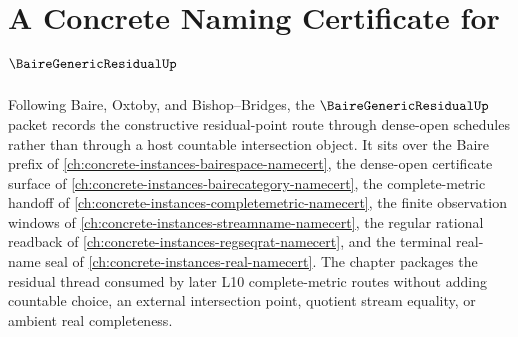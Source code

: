 \chapter{A Concrete Naming Certificate for $\BaireGenericResidualUp$}
\label{ch:concrete-instances-baire-generic-residual-namecert}

Following Baire, Oxtoby, and Bishop--Bridges, the $\BaireGenericResidualUp$ packet records the constructive residual-point route through dense-open schedules rather than through a host countable intersection object. It sits over the Baire prefix of \autoref{ch:concrete-instances-bairespace-namecert}, the dense-open certificate surface of \autoref{ch:concrete-instances-bairecategory-namecert}, the complete-metric handoff of \autoref{ch:concrete-instances-completemetric-namecert}, the finite observation windows of \autoref{ch:concrete-instances-streamname-namecert}, the regular rational readback of \autoref{ch:concrete-instances-regseqrat-namecert}, and the terminal real-name seal of \autoref{ch:concrete-instances-real-namecert}. The chapter packages the residual thread consumed by later L10 complete-metric routes without adding countable choice, an external intersection point, quotient stream equality, or ambient real completeness.

